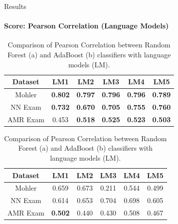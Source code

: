 \documentclass[aspectratio=169]{beamer}
\begin{document}
\begin{frame}{Results}
\framesubtitle{Score: Pearson Correlation (Language Models)}
\begin{table}
	\begin{subtable}[c]{0.5\textwidth}
		\centering
		\begin{tabular}{|c|c|c|c|c|c|}
			\hline
			Dataset & LM1 & LM2 & LM3 & LM4 & LM5 \\
			\hline
			Mohler \cite{} &\textbf{0.802}& \textbf{0.797}& \textbf{0.796}& \textbf{0.796}& \textbf{0.789}\\
			\hline
			NN Exam \cite{} &\textbf{0.732}& \textbf{0.670}& \textbf{0.705}& \textbf{0.755}& \textbf{0.760}\\
			\hline
			AMR Exam \cite{} &0.453& \textbf{0.518}& \textbf{0.525}& \textbf{0.523}& \textbf{0.503}\\
			\hline
		\end{tabular}
		\subcaption{}
	\end{subtable}
	\begin{subtable}[c]{0.5\textwidth}
		\centering
		\begin{tabular}{|c|c|c|c|c|c|}
			\hline
			Dataset & LM1 & LM2 & LM3 & LM4 & LM5 \\
			\hline
			Mohler \cite{} &0.659& 0.673& 0.211& 0.544& 0.499 \\
			\hline
			NN Exam \cite{} &0.614& 0.653& 0.704& 0.698& 0.605\\
			\hline
			AMR Exam \cite{} &\textbf{0.502}& 0.440& 0.430& 0.508& 0.467\\
			\hline
		\end{tabular}	
		\subcaption{}
	\end{subtable}
	\caption{Comparison of Pearson Correlation between Random Forest (a) and AdaBoost (b) classifiers with language models (LM).}
\end{table}
\end{frame}
\end{document}
